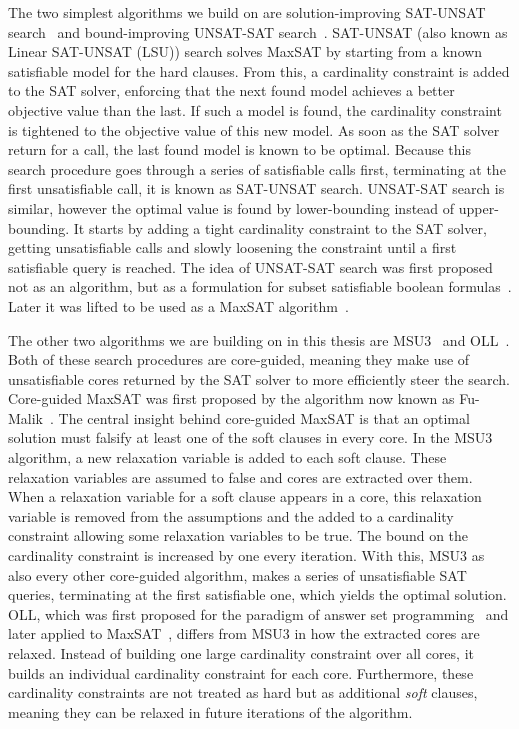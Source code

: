 The two simplest algorithms we build on are solution-improving SAT-UNSAT search~\autocite{DBLP:journals/jsat/BerreP10} and bound-improving UNSAT-SAT search~\autocite{DBLP:conf/sat/FuM06}.
SAT-UNSAT (also known as Linear SAT-UNSAT (LSU)) search solves MaxSAT by starting from a known satisfiable model for the hard clauses.
From this, a cardinality constraint is added to the SAT solver, enforcing that the next found model achieves a better objective value than the last.
If such a model is found, the cardinality constraint is tightened to the objective value of this new model.
As soon as the SAT solver return \unsat{} for a call, the last found model is known to be optimal.
Because this search procedure goes through a series of satisfiable calls first, terminating at the first unsatisfiable call, it is known as SAT-UNSAT search.
UNSAT-SAT search is similar, however the optimal value is found by lower-bounding instead of upper-bounding.
It starts by adding a tight cardinality constraint to the SAT solver, getting unsatisfiable calls and slowly loosening the constraint until a first satisfiable query is reached.
The idea of UNSAT-SAT search was first proposed not as an algorithm, but as a formulation for subset satisfiable boolean formulas~\autocite{DBLP:journals/tcad/XuRS03}.
Later it was lifted to be used as a MaxSAT algorithm~\autocite{DBLP:conf/sat/FuM06}.

The other two algorithms we are building on in this thesis are MSU3~\autocite{DBLP:journals/corr/abs-0712-1097} and OLL~\autocite{DBLP:conf/cp/MorgadoDM14,DBLP:journals/jsat/IgnatievMM19}.
Both of these search procedures are core-guided, meaning they make use of unsatisfiable cores returned by the SAT solver to more efficiently steer the search.
Core-guided MaxSAT was first proposed by the algorithm now known as Fu-Malik~\autocite{DBLP:conf/sat/FuM06}.
The central insight behind core-guided MaxSAT is that an optimal solution must falsify at least one of the soft clauses in every core.
In the MSU3 algorithm, a new relaxation variable is added to each soft clause.
These relaxation variables are assumed to false and cores are extracted over them.
When a relaxation variable for a soft clause appears in a core, this relaxation variable is removed from the assumptions and the added to a cardinality constraint allowing some relaxation variables to be true.
The bound on the cardinality constraint is increased by one every iteration.
With this, MSU3 as also every other core-guided algorithm, makes a series of unsatisfiable SAT queries, terminating at the first satisfiable one, which yields the optimal solution.
OLL, which was first proposed for the paradigm of answer set programming~\autocite{DBLP:conf/iclp/AndresKMS12} and later applied to MaxSAT~\autocite{DBLP:conf/cp/MorgadoDM14,DBLP:journals/jsat/IgnatievMM19}, differs from MSU3 in how the extracted cores are relaxed.
Instead of building one large cardinality constraint over all cores, it builds an individual cardinality constraint for each core.
Furthermore, these cardinality constraints are not treated as hard but as additional \emph{soft} clauses, meaning they can be relaxed in future iterations of the algorithm.

